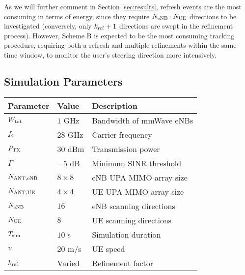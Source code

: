 \documentclass[conference]{IEEEtran}
\renewcommand{\arraystretch}{2}
\begin{document}
As we will further comment in Section \ref{sec:results}, refresh events are the most consuming in terms of energy, since they require $ N_{\rm eNB} \cdot N_{\rm UE}$ directions to be investigated (conversely, only $k_{\rm ref}+1$ directions are swept in the refinement process). 
However, Scheme B is expected to be the most consuming tracking procedure, requiring both a refresh and multiple refinements within the same time window, to monitor the user's steering direction more intensively. 


\subsection{Simulation Parameters}
\label{sec:sim:params}

\renewcommand{\arraystretch}{1}
\begin{table}[!t]
\small
\centering
\begin{tabular}{@{}lll@{}}
\toprule
Parameter & Value & Description \\ \midrule
 $W_{\rm tot}$ & $1$ GHz & Bandwidth of mmWave eNBs\\
 
$f_{\rm c}$ & $28$ GHz &  Carrier frequency \\

$P_{\rm TX}$ & $30$ dBm & Transmission power \\



$\Gamma$ & $ -5$ dB &  Minimum SINR threshold \\

$N_{\rm ANT,eNB}$ & $8 \times 8$  & eNB UPA MIMO array size  \\

$N_{\rm ANT,UE}$ & $4 \times 4$ & UE UPA MIMO array size\\

$N_{\rm eNB}$& $16$  & eNB scanning directions  \\

$N_{\rm UE}$& $8$  & UE scanning directions  \\


$T_{\rm sim}$ & $10$ s & Simulation duration \\

$v$ & $20$ m/s & UE speed\\

$k_{\rm ref}$ & Varied & Refinement factor\\


\end{tabular}
\end{table}
\end{document}
